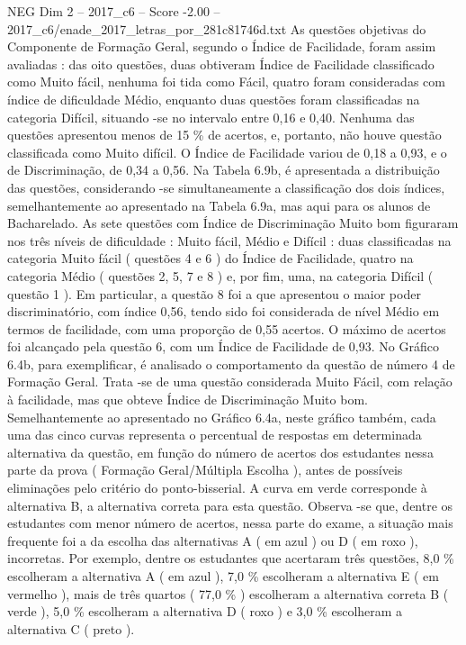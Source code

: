 \begin{textsample}{NEG Dim 2 – 2017\_c6 – Score -2.00 – 2017\_c6/enade\_2017\_letras\_por\_281c81746d.txt}
As questões objetivas do Componente de Formação Geral, segundo o Índice de Facilidade, foram assim avaliadas : das oito questões, duas obtiveram Índice de Facilidade classificado como Muito fácil, nenhuma foi tida como Fácil, quatro foram consideradas com índice de dificuldade Médio, enquanto duas questões foram classificadas na categoria Difícil, situando -se no intervalo entre 0,16 e 0,40.
Nenhuma das questões apresentou menos de 15 \% de acertos, e, portanto, não houve questão classificada como Muito difícil.
O Índice de Facilidade variou de 0,18 a 0,93, e o de Discriminação, de 0,34 a 0,56.
Na Tabela 6.9b, é apresentada a distribuição das questões, considerando -se simultaneamente a classificação dos dois índices, semelhantemente ao apresentado na Tabela 6.9a, mas aqui para os alunos de Bacharelado.
As sete questões com Índice de Discriminação Muito bom figuraram nos três níveis de dificuldade : Muito fácil, Médio e Difícil : duas classificadas na categoria Muito fácil ( questões 4 e 6 ) do Índice de Facilidade, quatro na categoria Médio ( questões 2, 5, 7 e 8 ) e, por fim, uma, na categoria Difícil ( questão 1 ).
Em particular, a questão 8 foi a que apresentou o maior poder discriminatório, com índice 0,56, tendo sido foi considerada de nível Médio em termos de facilidade, com uma proporção de 0,55 acertos.
O máximo de acertos foi alcançado pela questão 6, com um Índice de Facilidade de 0,93.
No Gráfico 6.4b, para exemplificar, é analisado o comportamento da questão de número 4 de Formação Geral.
Trata -se de uma questão considerada Muito Fácil, com relação à facilidade, mas que obteve Índice de Discriminação Muito bom.
Semelhantemente ao apresentado no Gráfico 6.4a, neste gráfico também, cada uma das cinco curvas representa o percentual de respostas em determinada alternativa da questão, em função do número de acertos dos estudantes nessa parte da prova ( Formação Geral/Múltipla Escolha ), antes de possíveis eliminações pelo critério do ponto-bisserial.
A curva em verde corresponde à alternativa B, a alternativa correta para esta questão.
Observa -se que, dentre os estudantes com menor número de acertos, nessa parte do exame, a situação mais frequente foi a da escolha das alternativas A ( em azul ) ou D ( em roxo ), incorretas.
Por exemplo, dentre os estudantes que acertaram três questões, 8,0 \% escolheram a alternativa A ( em azul ), 7,0 \% escolheram a alternativa E ( em vermelho ), mais de três quartos ( 77,0 \% ) escolheram a alternativa correta B ( verde ), 5,0 \% escolheram a alternativa D ( roxo ) e 3,0 \% escolheram a alternativa C ( preto ).

\end{textsample}
